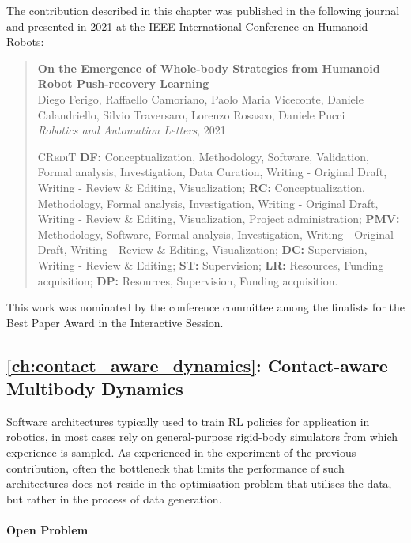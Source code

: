 The contribution described in this chapter was published in the following journal and presented in 2021 at the IEEE International Conference on Humanoid Robots:
%
\begin{quote}
    \textbf{On the Emergence of Whole-body Strategies from
Humanoid Robot Push-recovery Learning} \\
    Diego Ferigo, Raffaello Camoriano, Paolo Maria Viceconte, Daniele Calandriello, Silvio Traversaro, Lorenzo Rosasco, Daniele Pucci \\
    \textit{Robotics and Automation Letters}, 2021

    \vspace{1mm}
    \textsc{CRediT} \hspace{2mm}
    \textbf{DF:} Conceptualization, Methodology, Software, Validation, Formal analysis, Investigation, Data Curation, Writing - Original Draft, Writing - Review \& Editing, Visualization;
    \textbf{RC:} Conceptualization, Methodology, Formal analysis, Investigation, Writing - Original Draft, Writing - Review \& Editing, Visualization, Project administration;
    \textbf{PMV:} Methodology, Software, Formal analysis, Investigation, Writing - Original Draft, Writing - Review \& Editing, Visualization;
    \textbf{DC:} Supervision, Writing - Review \& Editing;
    \textbf{ST:} Supervision;
    \textbf{LR:} Resources, Funding acquisition;
    \textbf{DP:} Resources, Supervision, Funding acquisition.
\end{quote}

\noindent
This work was nominated by the conference committee among the finalists for the Best Paper Award in the Interactive Session.

\subsection{\autoref{ch:contact_aware_dynamics}: Contact-aware Multibody Dynamics}

Software architectures typically used to train \ac{RL} policies for application in robotics, in most cases rely on general-purpose rigid-body simulators from which experience is sampled.
As experienced in the experiment of the previous contribution, often the bottleneck that limits the performance of such architectures does not reside in the optimisation problem that utilises the data, but rather in the process of data generation.

\pagebreak
\paragraph{Open Problem}

